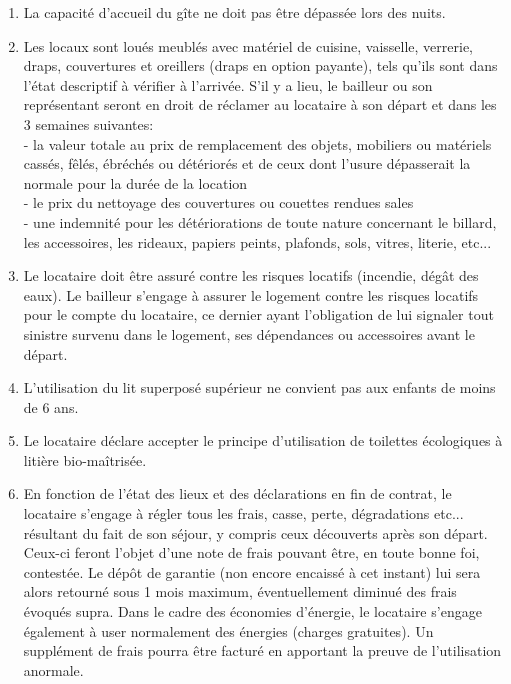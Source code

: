 \documentclass[a4paper,11pt]{article}
\begin{document}
\begin{enumerate}
\item La capacité d'accueil du gîte ne doit pas être dépassée lors des nuits.



\item Les locaux sont loués meublés avec matériel de cuisine, vaisselle, verrerie, draps, couvertures et oreillers (draps en option payante), tels qu’ils sont dans l’état descriptif à vérifier à l'arrivée.
S’il y a lieu, le bailleur ou son représentant seront en droit de réclamer au locataire à son départ et dans les 3 semaines suivantes:\\
- la valeur totale au prix de remplacement des objets, mobiliers ou matériels cassés, fêlés, ébréchés ou détériorés et de ceux dont l’usure dépasserait la normale pour la durée de la location\\
- le prix du nettoyage des couvertures ou couettes rendues sales\\
- une indemnité pour les détériorations de toute nature concernant le billard, les accessoires, les rideaux, papiers peints, plafonds, sols, vitres, literie, etc...\\



\item Le locataire doit être assuré contre les risques locatifs (incendie, dégât des eaux). 
Le bailleur s'engage à assurer le logement contre les risques locatifs pour le compte du locataire, ce dernier ayant l'obligation de lui signaler  tout sinistre survenu dans le logement, ses dépendances ou accessoires avant le départ.





\item L'utilisation du lit superposé supérieur ne convient pas aux enfants de moins de 6 ans.

\item Le locataire déclare accepter le principe d'utilisation de toilettes écologiques à litière bio-maîtrisée.

\item En fonction de l’état des lieux et des déclarations en fin de contrat, le locataire s’engage à régler tous les frais, casse, perte, dégradations etc... résultant du fait de son séjour, y compris ceux découverts après son départ.
Ceux-ci feront l'objet d'une note de frais pouvant être, en toute bonne foi, contestée. 
Le dépôt de garantie (non encore encaissé à cet instant) lui sera alors retourné sous 1 mois maximum, éventuellement diminué des frais évoqués supra.
Dans le cadre des économies d’énergie, le locataire s’engage également à user normalement des énergies (charges gratuites).
Un supplément de frais pourra être facturé en apportant la preuve de l’utilisation anormale.


\end{enumerate}
\end{document}
